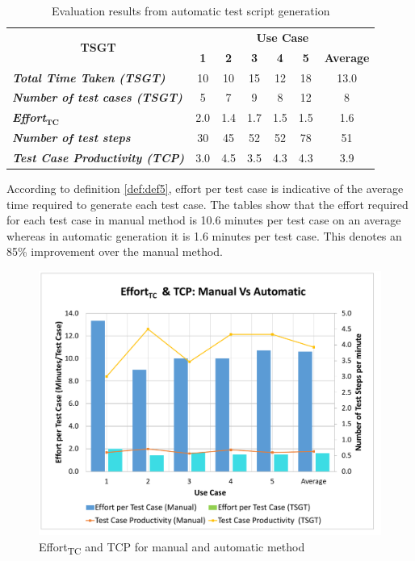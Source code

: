 \begin{table}[htbp]
  \centering
  \caption{Evaluation results from automatic test script generation}
  	\begin{adjustbox}{width=1\textwidth}
    \begin{tabular}{|l|c|c|c|c|c|c|}
    \toprule
    \multicolumn{1}{|c|}{\multirow{2}[4]{*}{\textbf{TSGT}}} & \multicolumn{6}{c|}{\textbf{Use Case }} \\
\cmidrule{2-7}          & \textbf{1} & \textbf{2} & \textbf{3} & \textbf{4} & \textbf{5} & \textbf{Average} \\
    \midrule
    \textit{\textbf{Total Time Taken (TSGT)}} & 10    & 10    & 15    & 12    & 18    & 13.0 \\
    \midrule
    \textit{\textbf{Number of test cases (TSGT)}} & 5     & 7     & 9     & 8     & 12    & 8 \\
    \midrule
    \textit{\textbf{Effort$ _{\textbf{TC}}$}} & 2.0   & 1.4   & 1.7   & 1.5   & 1.5   & 1.6 \\
    \midrule
    \textit{\textbf{Number of test steps}} & 30    & 45    & 52    & 52    & 78    & 51 \\
    \midrule
    \textit{\textbf{Test Case Productivity (TCP)}} & 3.0   & 4.5   & 3.5   & 4.3   & 4.3   & 3.9 \\
    \bottomrule
    \end{tabular}%
    \end{adjustbox}
  \label{tab:toolresults}%
\end{table}%


According to definition \ref{def:def5}, effort per test case is indicative of the average time required to generate each test case. The tables show that the effort required for each test case in manual method is 10.6 minutes per test case on an average whereas in automatic generation it is 1.6 minutes per test case. This denotes an 85\% improvement over the manual method.

\begin{figure}[htb!]
\centering
\includegraphics[scale=0.45]{content/images/Chapter6/figure2.pdf}
\caption{Effort\textsubscript{TC} and TCP for manual and automatic method}
\label{fig:chap6fig2}
\end{figure}

